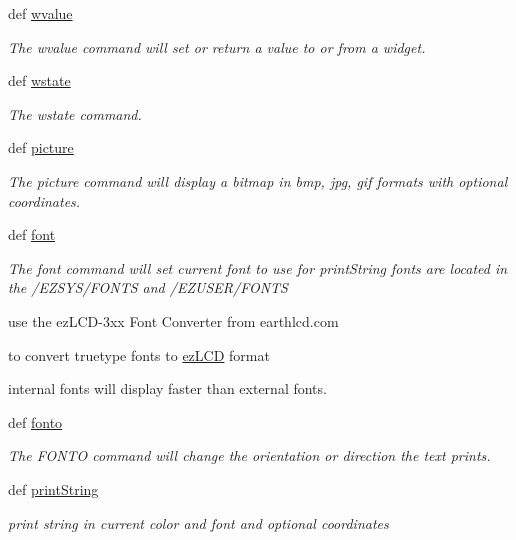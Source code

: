 \begin{DoxyCompactItemize}
def \hyperlink{group___widgets_ga57c35a2e95d92bbeaeefc71ffd9998fc}{wvalue}
\begin{DoxyCompactList}\small\item\em The wvalue command will set or return a value to or from a widget. \end{DoxyCompactList}\item 
def \hyperlink{group___widgets_ga68f19c87c7284b550f150b81327125aa}{wstate}
\begin{DoxyCompactList}\small\item\em The wstate command. \end{DoxyCompactList}\item 
def \hyperlink{group___bitmap_font_ga675ef467cb7a69ab8c19024bfd0775d6}{picture}
\begin{DoxyCompactList}\small\item\em The picture command will display a bitmap in bmp, jpg, gif formats with optional coordinates. \end{DoxyCompactList}\item 
def \hyperlink{group___bitmap_font_gaf4cf49efa8ac77f85a27f2bafe6b80cf}{font}
\begin{DoxyCompactList}\small\item\em The font command will set current font to use for print\-String fonts are located in the /\-E\-Z\-S\-Y\-S/\-F\-O\-N\-T\-S and /\-E\-Z\-U\-S\-E\-R/\-F\-O\-N\-T\-S \par
 use the ez\-L\-C\-D-\/3xx Font Converter from earthlcd.\-com \par
 to convert truetype fonts to \hyperlink{classmodule_1_1ez_l_c_d3xx_1_1ez_l_c_d}{ez\-L\-C\-D} format \par
 internal fonts will display faster than external fonts. \end{DoxyCompactList}\item 
def \hyperlink{group___bitmap_font_ga9e4a0699fcde7bdd65fd97720b60b3d3}{fonto}
\begin{DoxyCompactList}\small\item\em The F\-O\-N\-T\-O command will change the orientation or direction the text prints. \end{DoxyCompactList}\item 
def \hyperlink{group___bitmap_font_ga9156f7c9f1239d24a3a8a7ade64291d8}{print\-String}
\begin{DoxyCompactList}\small\item\em print string in current color and font and optional coordinates \end{DoxyCompactList}\end{DoxyCompactItemize}
